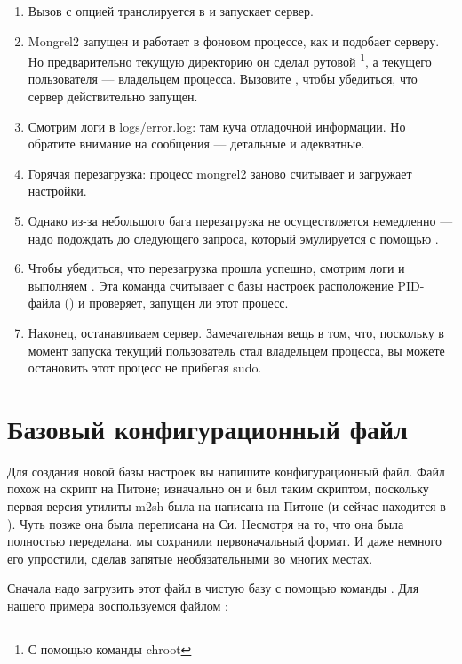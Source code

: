 \begin{enumerate}
\item Вызов  с опцией  транслируется в
     и запускает
    сервер.
\item Mongrel2 запущен и работает в фоновом процессе, как и подобает
    серверу. Но предварительно текущую директорию он сделал рутовой
    \footnote{С помощью команды chroot}, а текущего пользователя ---
    владельцем процесса. Вызовите , чтобы убедиться, что
    сервер действительно запущен.
\item Смотрим логи в logs/error.log: там куча отладочной информации.
    Но обратите внимание на сообщения --- детальные и адекватные.
\item Горячая перезагрузка: процесс mongrel2 заново считывает и загружает
    настройки.
\item Однако из-за небольшого бага перезагрузка не осуществляется
    немедленно --- надо подождать до следующего запроса, который
    эмулируется с помощью .
\item Чтобы убедиться, что перезагрузка прошла успешно, смотрим логи и
    выполняем . Эта команда считывает с базы настроек
    расположение PID-файла () и проверяет, запущен
    ли этот процесс.
\item Наконец, останавливаем сервер. Замечательная вещь в том, что,
    поскольку в момент запуска текущий пользователь стал владельцем
    процесса, вы можете остановить этот процесс не прибегая sudo.
\end{enumerate}

\section{Базовый конфигурационный файл}

Для создания новой базы настроек вы напишите конфигурационный файл.
Файл похож на скрипт на Питоне; изначально он и был таким скриптом,
поскольку первая версия утилиты m2sh была на написана на Питоне (и
сейчас находится в ). Чуть позже она была
переписана на Си.  Несмотря на то, что она была полностью переделана,
мы сохранили первоначальный формат. И даже немного его упростили,
сделав запятые необязательными во многих местах.

Сначала надо загрузить этот файл в чистую базу с помощью команды
. Для нашего примера воспользуемся файлом
:

